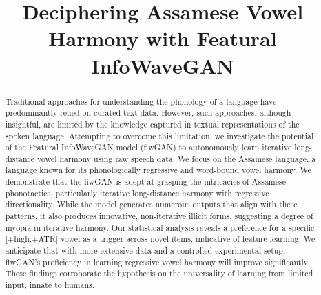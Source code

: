 \documentclass{Interspeech2024}
\title{Deciphering Assamese Vowel Harmony with Featural InfoWaveGAN}
\begin{document}
\maketitle

\begin{abstract}

\noindent Traditional approaches for understanding the phonology of a language have predominantly relied on curated text data. However, such approaches, although insightful, are limited by the knowledge captured in textual representations of the spoken language. Attempting to overcome this limitation, we investigate the potential of the Featural InfoWaveGAN model (fiwGAN) to autonomously learn iterative long-distance vowel harmony using raw speech data. We focus on the Assamese language, a language known for its phonologically regressive and word-bound vowel harmony. We demonstrate that the fiwGAN is adept at grasping the intricacies of Assamese phonotactics, particularly iterative long-distance harmony with regressive directionality. While the model generates numerous outputs that align with these patterns, it also produces innovative, non-iterative illicit forms, suggesting a degree of myopia in iterative harmony. Our statistical analysis reveals a preference for a specific [+high,+ATR] vowel as a trigger across novel items, indicative of feature learning. We anticipate that with more extensive data and a controlled experimental setup, fiwGAN's proficiency in learning regressive vowel harmony will improve significantly. These findings corroborate the hypothesis on the universality of learning from limited input, innate to humans.

\end{abstract}
\end{document}
